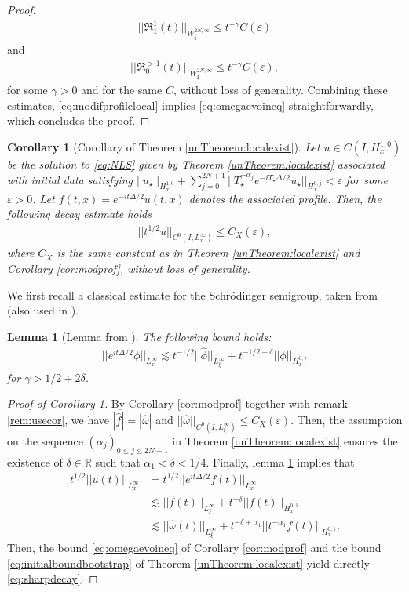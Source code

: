 \documentclass[a4paper, 15pt]{article}
\numberwithin{equation}{section}
\newtheorem{cor}[defi]{Corollary}
\newtheorem{lem}[defi]{Lemma}
\begin{document}
\begin{proof}
\begin{align*}
||\mathfrak{R}^1_{1}(t)||_{W^{2N,\infty}_\xi}\leq t^{-\gamma}C(\varepsilon)
\end{align*} 
and 
\begin{align*}
||\mathfrak{R}^{>1}_0(t)||_{W^{2N,\infty}_\xi}\leq t^{-\gamma}C(\varepsilon),
\end{align*} 
for some $\gamma>0$ and for the same $C$, without loss of generality. Combining these estimates, \eqref{eq:modifprofilelocal} implies  \eqref{eq:omegaevoineq} straightforwardly, which concludes the proof.
\end{proof}
\begin{cor}[Corollary of Theorem \ref{unTheorem:localexist}]
\label{cor:decay}
Let $u\in C(I,H^{1,0}_x)$ be the solution to \eqref{eq:NLS} given by Theorem \ref{unTheorem:localexist} associated with initial data satisfying $||u_\star||_{H^{1,0}_x}+\sum^{2N+1}_{j=0}||T_\star^{-\alpha_j}e^{-iT_\star\Delta/2}u_\star||_{H^{0,j}_x}<\varepsilon$ for some $\varepsilon>0$. Let $f(t,x)=e^{-it\Delta/2}u(t,x)$ denotes the associated profile. Then, the following decay estimate holds
\begin{align}
\label{eq:sharpdecay}
||t^{1/2}u||_{C^0(I,L^\infty_x)}\leq C_X(\varepsilon),
\end{align}
where $C_X$ is the same constant as in Theorem \ref{unTheorem:localexist} and Corollary \ref{cor:modprof}, without loss of generality.
\end{cor}
We first recall a classical estimate for the Schrödinger semigroup, taken from \cite{zbMATH01192427} (also used in \cite{zbMATH06033880}). \\
\begin{lem}[Lemma from \cite{zbMATH01192427}]
\label{lem:semigroup}
The following bound holds: 
\begin{align}
||e^{it\Delta/2}\phi||_{L^\infty_x}\lesssim t^{-1/2}||\hat{\phi}||_{L^\infty_\xi}+t^{-1/2-\delta}||\phi||_{H^{0,\gamma}_x}
\end{align}
for $\gamma>1/2+2\delta$. 
\end{lem}
\begin{proof}[Proof of Corollary \ref{cor:decay}]
By Corollary \ref{cor:modprof} together with remark \ref{rem:usecor}, we have $|\hat{f}|=|\hat{\omega}|$ and $||\hat{\omega}||_{C^0(I,L^{\infty}_\xi)}\leq C_X(\varepsilon)$. Then, the assumption on the sequence $(\alpha_j)_{0\leq j\leq 2N+1}$ in Theorem \ref{unTheorem:localexist} ensures the existence of $\delta\in\mathbb{R}$ such that $\alpha_1<\delta<1/4$. Finally, lemma \ref{lem:semigroup} implies that
\begin{align*}
t^{1/2}||u(t)||_{L^\infty_x}&=t^{1/2}||e^{it\Delta/2}f(t)||_{L^\infty_x}\\
&\lesssim ||\hat{f}(t)||_{L^\infty_\xi}+t^{-\delta}||f(t)||_{H^{0,1}_x}\\
&\lesssim ||\hat{\omega}(t)||_{L^\infty_\xi}+t^{-\delta+\alpha_1}||t^{-\alpha_1}f(t)||_{H^{0,1}_x}.
\end{align*} 
Then, the bound \ref{eq:omegaevoineq} of Corollary \ref{cor:modprof} and the bound \eqref{eq:initialboundbootstrap} of Theorem \ref{unTheorem:localexist} yield directly \eqref{eq:sharpdecay}. 
\end{proof}
\end{document}
